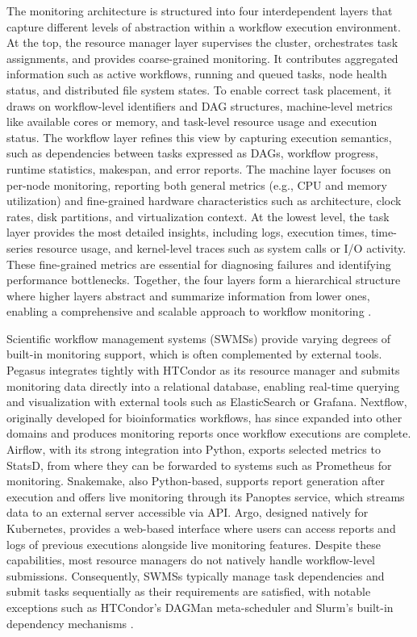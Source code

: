 The monitoring architecture is structured into four interdependent layers that capture different levels of abstraction within a workflow execution environment. At the top, the resource manager layer supervises the cluster, orchestrates task assignments, and provides coarse-grained monitoring. It contributes aggregated information such as active workflows, running and queued tasks, node health status, and distributed file system states. To enable correct task placement, it draws on workflow-level identifiers and DAG structures, machine-level metrics like available cores or memory, and task-level resource usage and execution status. The workflow layer refines this view by capturing execution semantics, such as dependencies between tasks expressed as DAGs, workflow progress, runtime statistics, makespan, and error reports. The machine layer focuses on per-node monitoring, reporting both general metrics (e.g., CPU and memory utilization) and fine-grained hardware characteristics such as architecture, clock rates, disk partitions, and virtualization context. At the lowest level, the task layer provides the most detailed insights, including logs, execution times, time-series resource usage, and kernel-level traces such as system calls or I/O activity. These fine-grained metrics are essential for diagnosing failures and identifying performance bottlenecks. Together, the four layers form a hierarchical structure where higher layers abstract and summarize information from lower ones, enabling a comprehensive and scalable approach to workflow monitoring \cite{Bader_2022}.

Scientific workflow management systems (SWMSs) provide varying degrees of built-in monitoring support, which is often complemented by external tools. Pegasus integrates tightly with HTCondor as its resource manager and submits monitoring data directly into a relational database, enabling real-time querying and visualization with external tools such as ElasticSearch or Grafana. Nextflow, originally developed for bioinformatics workflows, has since expanded into other domains and produces monitoring reports once workflow executions are complete. Airflow, with its strong integration into Python, exports selected metrics to StatsD, from where they can be forwarded to systems such as Prometheus for monitoring. Snakemake, also Python-based, supports report generation after execution and offers live monitoring through its Panoptes service, which streams data to an external server accessible via API. Argo, designed natively for Kubernetes, provides a web-based interface where users can access reports and logs of previous executions alongside live monitoring features. Despite these capabilities, most resource managers do not natively handle workflow-level submissions. Consequently, SWMSs typically manage task dependencies and submit tasks sequentially as their requirements are satisfied, with notable exceptions such as HTCondor’s DAGMan meta-scheduler and Slurm’s built-in dependency mechanisms \cite{Bader_2022}.

